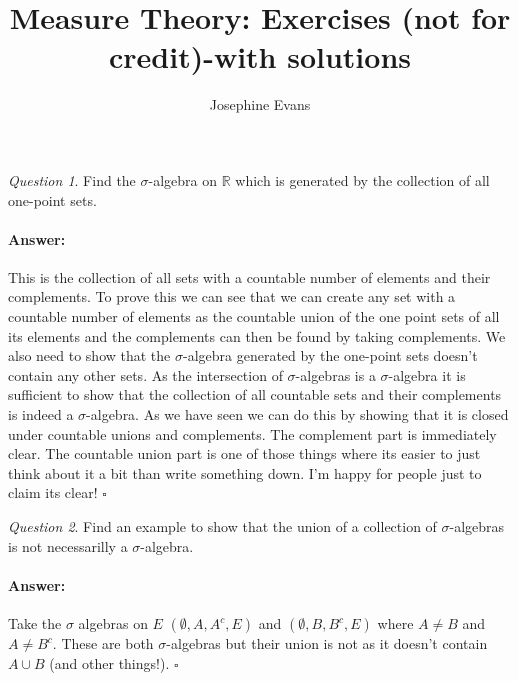 \documentclass[11pt]{article}
\author{
Josephine Evans
}
\title{Measure Theory: Exercises (not for credit)-with solutions}
\theoremstyle{definition}
\theoremstyle{remark}
\newtheorem{q}{Question}
\newenvironment{ans}{\paragraph{Answer:}}{\hfill$\square$}
\begin{document}
\maketitle

\begin{q}
Find the $\sigma$-algebra on $\mathbb{R}$ which is generated by the collection of all one-point sets.
\end{q}
\begin{ans}
This is the collection of all sets with a countable number of elements and their complements. To prove this we can see that we can create any set with a countable number of elements as the countable union of the one point sets of all its elements and the complements can then be found by taking complements. We also need to show that the $\sigma$-algebra generated by the one-point sets doesn't contain any other sets. As the intersection of $\sigma$-algebras is a $\sigma$-algebra it is sufficient to show that the collection of all countable sets and their complements is indeed a $\sigma$-algebra. As we have seen we can do this by showing that it is closed under countable unions and complements. The complement part is immediately clear. The countable union part is one of those things where its easier to just think about it a bit than write something down. I'm happy for people just to claim its clear!
\end{ans}

\vspace{10pt}

\begin{q}
Find an example to show that the union of a collection of $\sigma$-algebras is not necessarilly a $\sigma$-algebra.
\end{q}
\begin{ans}
Take the $\sigma$ algebras on $E$ $(\emptyset, A, A^c, E)$ and $(\emptyset, B, B^c, E)$ where $A \neq B$ and $A \neq B^c$. These are both $\sigma$-algebras but their union is not as it doesn't contain $A \cup B$ (and other things!).
\end{ans}

\vspace{10pt}
\end{document}
